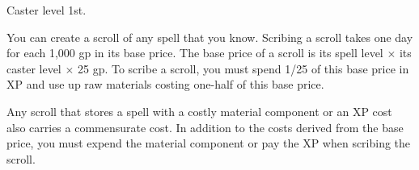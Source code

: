 {Caster level 1st.}
{You can create a scroll of any spell that you know. Scribing a scroll takes one day for each 1,000 gp in its base price. The base price of a scroll is its spell level $\times$ its caster level $\times$ 25 gp. To scribe a scroll, you must spend 1/25 of this base price in XP and use up raw materials costing one-half of this base price.

Any scroll that stores a spell with a costly material component or an XP cost also carries a commensurate cost. In addition to the costs derived from the base price, you must expend the material component or pay the XP when scribing the scroll.}